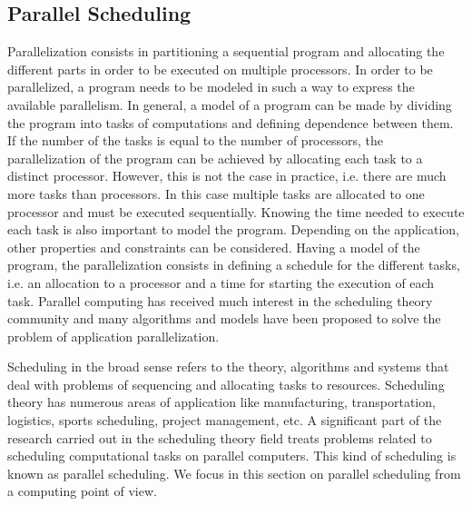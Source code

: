\subsection{Parallel Scheduling}

Parallelization consists in partitioning a sequential program and allocating the different parts in order to be executed on multiple processors. In order to be parallelized, a program needs to be modeled in such a way to express the available parallelism. In general, a model of a program can be made by dividing the program into tasks of computations and defining dependence between them. 
If the number of the tasks is equal to the number of processors, the parallelization of the program can be achieved by allocating each task to a distinct processor. However, this is not the case in practice, i.e. there are much more tasks than processors. In this case multiple tasks are allocated to one processor and must be executed sequentially.  
Knowing the time needed to execute each task is also important to model the program. Depending on the application, other properties and constraints can be considered. Having a model of the program, the parallelization consists in defining a schedule for the different tasks, i.e. an allocation to a processor and a time for starting the execution of each task. Parallel computing has received much interest in the scheduling theory community and many algorithms and models have been proposed to solve the problem of application parallelization.   

Scheduling in the broad sense refers to the theory, algorithms and systems that deal with problems of sequencing and allocating tasks to resources. Scheduling theory has numerous areas of application like manufacturing, transportation, logistics, sports scheduling, project management, etc.%
A significant part of the research carried out in the scheduling theory field treats problems related to scheduling computational tasks on parallel computers. This kind of scheduling is known as parallel scheduling. We focus in this section on parallel scheduling from a computing point of view.

